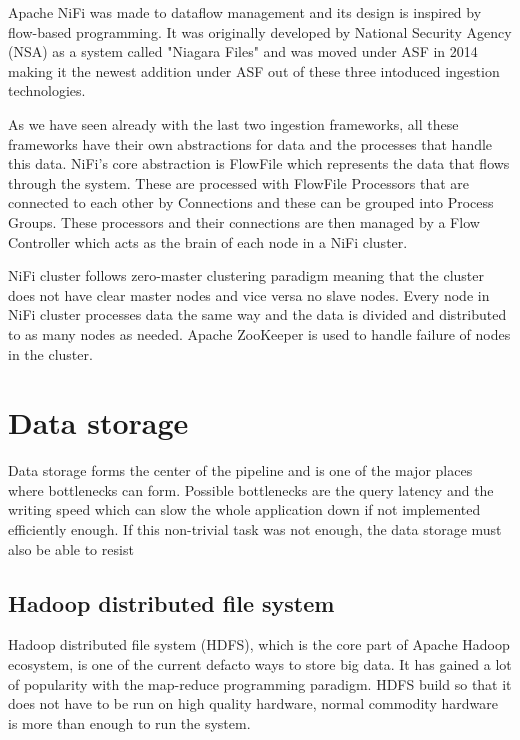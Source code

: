Apache NiFi was made to dataflow management and its design is inspired by flow-based programming.
It was originally developed by National Security Agency (NSA) as a system called "Niagara Files" and was moved under ASF in 2014 making it the newest addition under ASF out of these three intoduced ingestion technologies. \cite{bridgwater}

As we have seen already with the last two ingestion frameworks, all these frameworks have their own abstractions for data and the processes that handle this data.
NiFi's core abstraction is FlowFile which represents the data that flows through the system. 
These are processed with FlowFile Processors that are connected to each other by Connections and these can be grouped into Process Groups.
These processors and their connections are then managed by a Flow Controller which acts as the brain of each node in a NiFi cluster. \cite{nifi}

NiFi cluster follows zero-master clustering paradigm meaning that the cluster does not have clear master nodes and vice versa no slave nodes.
Every node in NiFi cluster processes data the same way and the data is divided and distributed to as many nodes as needed.
Apache ZooKeeper is used to handle failure of nodes in the cluster.\cite{nifi}

\section{Data storage}

Data storage forms the center of the pipeline and is one of the major places where bottlenecks can form.
Possible bottlenecks are the query latency and the writing speed which can slow the whole application down if not implemented efficiently enough.
If this non-trivial task was not enough, the data storage must also be able to resist 

\subsection{Hadoop distributed file system}

Hadoop distributed file system (HDFS), which is the core part of Apache Hadoop ecosystem, is one of the current defacto ways to store big data.
It has gained a lot of popularity with the map-reduce programming paradigm.
HDFS build so that it does not have to be run on high quality hardware, normal commodity hardware is more than enough to run the system.\cite{hdfs}

